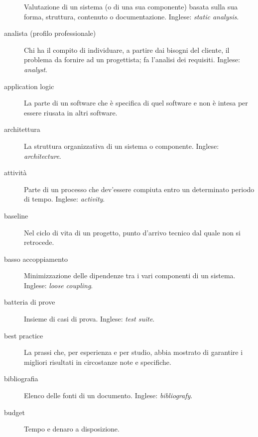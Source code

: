 \documentclass[a4paper]{article}
\begin{document}
\begin{description}
			Valutazione di un sistema (o di una sua componente) basata sulla sua forma, struttura, contenuto o documentazione. Inglese: \emph{static analysis}.
			
	\item[analista (profilo professionale)] 

			Chi ha il compito di individuare, a partire dai bisogni del cliente, il problema da fornire ad un progettista; fa l'analisi dei requisiti. Inglese: \emph{analyst}.
			
	\item[application logic] 

			La parte di un software che è specifica di quel software e non è intesa per essere riusata in altri software.
			
	\item[architettura] 

			La struttura organizzativa di un sistema o componente. Inglese: \emph{architecture}.
			
	\item[attività] 

			Parte di un processo che dev'essere compiuta entro un determinato periodo di tempo. Inglese: \emph{activity}.
			
	\item[baseline] 

			Nel ciclo di vita di un progetto, punto d'arrivo tecnico dal quale non si retrocede.
			
	\item[basso accoppiamento] 

			Minimizzazione delle dipendenze tra i vari componenti di un sistema. Inglese: \emph{loose coupling}.
			
	\item[batteria di prove] 

			Insieme di casi di prova. Inglese: \emph{test suite}.
			
	\item[best practice] 

			La prassi che, per esperienza e per studio, abbia mostrato di garantire i migliori risultati in circostanze note e specifiche.
			
	\item[bibliografia] 

			Elenco delle fonti di un documento. Inglese: \emph{bibliografy}.
			
	\item[budget] 

			Tempo e denaro a disposizione.
			

\end{description}
\end{document}
